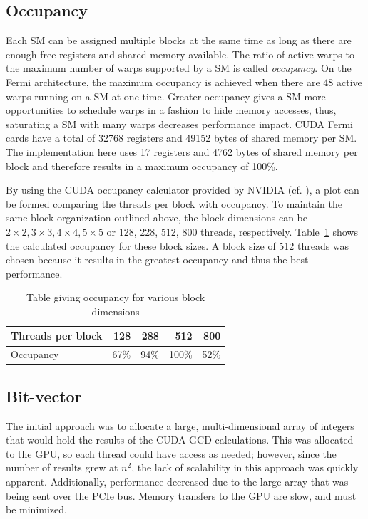 \documentclass[12pt]{ucthesis}
\begin{document}
\subsection{Occupancy}
\label{sec:occupancy}
Each SM can be assigned multiple blocks at the same time as long as there are 
enough free registers and shared memory available. The ratio of active warps 
to the maximum number of warps supported by a SM is called \emph{occupancy}. 
On the Fermi architecture, the maximum occupancy is achieved when there are 48 
active warps running on a SM at one time. Greater occupancy gives a SM more
opportunities to schedule warps in a fashion to hide memory accesses, thus,
saturating a SM with many warps decreases performance impact. CUDA Fermi cards
have a total of 32768 registers and 49152 bytes of shared memory per SM. The
implementation here uses 17 registers and 4762 bytes of shared memory per
block and therefore results in a maximum occupancy of 100\%.

By using the CUDA occupancy calculator provided by NVIDIA (cf. 
\cite{nvidia2012gpu}), a plot can be formed comparing the threads per block 
with occupancy. To maintain the same block organization outlined above, the 
block dimensions can be $2\times2, 3\times3, 4\times4, 5\times5$ or 128, 228, 
512, 800 threads, respectively. Table~\ref{tab:occupancy} shows the calculated 
occupancy for these block sizes. A block size of 512 threads was chosen 
because it results in the greatest occupancy and thus the best performance. 

\begin{table}
   \centering
   \begin{tabular}{l|rrrr}
      Threads per block & 128 & 288 & 512 & 800\\
      \hline
              Occupancy & 67\% & 94\% & 100\% & 52\%\\
   \end{tabular}
   \caption{Table giving occupancy for various block dimensions}
   \label{tab:occupancy}
\end{table}

\subsection{Bit-vector}
\label{subsec:bitvector}
The initial approach was to allocate a large, multi-dimensional array of 
integers that would hold the results of the CUDA GCD calculations. This was 
allocated to the GPU, so each thread could have access as needed; however, 
since the number of results grew at $n^2$, the lack of scalability in this 
approach was quickly apparent. Additionally, performance decreased due to the 
large array that was being sent over the PCIe bus. Memory transfers to 
the GPU are slow, and must be minimized.
\end{document}
